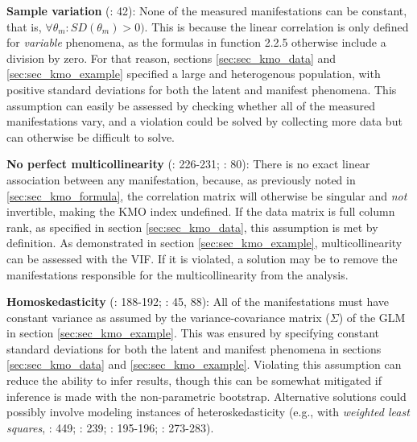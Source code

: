 \documentclass[
  10pt,
  a4paper,
  twoside]{article}
\begin{document}
\textbf{Sample variation} (: 42): None of the measured manifestations can be constant, that is, \(\forall \theta_m: SD(\theta_m) > 0)\). This is because the linear correlation is only defined for \emph{variable} phenomena, as the formulas in function 2.2.5 otherwise include a division by zero. For that reason, sections \ref{sec:sec_kmo_data} and \ref{sec:sec_kmo_example} specified a large and heterogenous population, with positive standard deviations for both the latent and manifest phenomena. This assumption can easily be assessed by checking whether all of the measured manifestations vary, and a violation could be solved by collecting more data but can otherwise be difficult to solve.

\textbf{No perfect multicollinearity} (: 226-231; : 80): There is no exact linear association between any manifestation, because, as previously noted in \ref{sec:sec_kmo_formula}, the correlation matrix will otherwise be singular and \emph{not} invertible, making the KMO index undefined. If the data matrix is full column rank, as specified in section \ref{sec:sec_kmo_data}, this assumption is met by definition. As demonstrated in section \ref{sec:sec_kmo_example}, multicollinearity can be assessed with the VIF. If it is violated, a solution may be to remove the manifestations responsible for the multicollinearity from the analysis.

\textbf{Homoskedasticity} (: 188-192; : 45, 88): All of the manifestations must have constant variance as assumed by the variance-covariance matrix (\(\Sigma\)) of the GLM in section \ref{sec:sec_kmo_example}. This was ensured by specifying constant standard deviations for both the latent and manifest phenomena in sections \ref{sec:sec_kmo_data} and \ref{sec:sec_kmo_example}. Violating this assumption can reduce the ability to infer results, though this can be somewhat mitigated if inference is made with the non-parametric bootstrap. Alternative solutions could possibly involve modeling instances of heteroskedasticity (e.g., with \emph{weighted least squares}, : 449; : 239; : 195-196; : 273-283).
\end{document}
